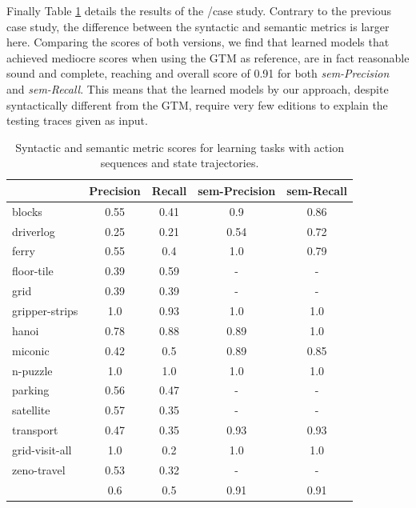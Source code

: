 Finally Table \ref{tab:metric_comparison_0_0} details the results of the \NO/\NO case study. Contrary to the previous case study, the difference between the syntactic and semantic metrics is larger here. Comparing the scores of both versions, we find that learned models that achieved mediocre scores when using the GTM as reference, are in fact reasonable sound and complete, reaching and overall score of 0.91 for both {\em sem-Precision} and {\em sem-Recall}. This means that the learned models by our approach, despite syntactically different from the GTM, require very few editions to explain the testing traces given as input.

\begin{table}[hbt!]
     \begin{footnotesize}
	\begin{center}		
		\begin{tabular}{l|c|c|c|c|}		
			& {\bf Precision} & {\bf Recall} & {\bf sem-Precision} & {\bf sem-Recall} \\
			\hline
			blocks & 0.55 & 0.41 & 0.9 & 0.86 \\
			driverlog & 0.25 & 0.21 & 0.54 & 0.72 \\
			ferry & 0.55 & 0.4 & 1.0 & 0.79 \\
			floor-tile & 0.39 & 0.59 & - & - \\
			grid & 0.39 & 0.39 & - & - \\
			gripper-strips & 1.0 & 0.93 & 1.0 & 1.0 \\
			hanoi & 0.78 & 0.88 & 0.89 & 1.0 \\
			miconic & 0.42 & 0.5 & 0.89 & 0.85 \\
			n-puzzle & 1.0 & 1.0 & 1.0 & 1.0 \\
			parking & 0.56 & 0.47 & - & - \\
			satellite & 0.57 & 0.35 & - & - \\
			transport & 0.47 & 0.35 & 0.93 & 0.93 \\
			grid-visit-all & 1.0 & 0.2 & 1.0 & 1.0 \\
			zeno-travel & 0.53 & 0.32 & - & - \\
			\hline
			& 0.6 & 0.5 & 0.91 & 0.91
		\end{tabular}
	\end{center}
        \end{footnotesize}
	\caption{\small Syntactic and semantic metric scores for learning tasks with \NO action sequences and \NO state trajectories.}
	\label{tab:metric_comparison_0_0}
\end{table}

